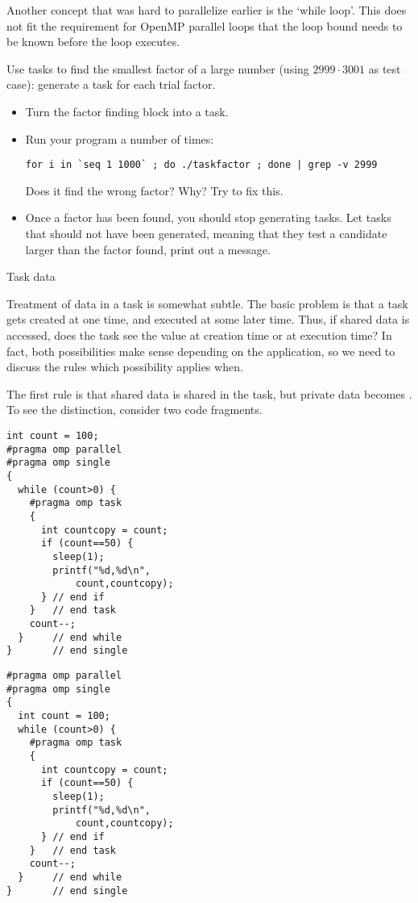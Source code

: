 Another concept that was hard to parallelize earlier is the `while
loop'. This does not fit the requirement for OpenMP parallel loops
that the loop bound needs to be known before the loop executes.

\begin{exercise}
  \label{ex:taskfactor}
  Use tasks to find the smallest factor of a large
  number (using $2999\cdot 3001$ as test case): generate a task for each
  trial factor.
  \begin{itemize}
  \item Turn the factor finding block into a task.
  \item Run your program a number of times:
\begin{verbatim}
for i in `seq 1 1000` ; do ./taskfactor ; done | grep -v 2999
\end{verbatim}
    Does it find the wrong factor? Why? Try to fix this.
\item Once a factor has been found, you should stop generating
    tasks.
    Let tasks that should not have been generated, meaning that they
    test a candidate larger than the factor found, print out a message.
  \end{itemize}
\end{exercise}


 {Task data}

Treatment of data in a task is somewhat subtle. The basic problem is
that a task gets created at one time, and executed at some later time.
Thus,
if shared data is accessed, does the task see the value at creation
time or at execution time? In fact, both possibilities make sense
depending on the application, so we need to discuss the rules 
which possibility applies when.

The first rule is that shared data is shared in the task, but private
data becomes . To see the distinction, consider two
code fragments.

\begin{multicols}{2}
\begin{lstlisting}[language=omp]
int count = 100;
#pragma omp parallel
#pragma omp single
{
  while (count>0) {
    #pragma omp task
    {
      int countcopy = count;
      if (count==50) {
        sleep(1);
        printf("%d,%d\n",
            count,countcopy);
      } // end if
    }   // end task
    count--;
  }     // end while
}       // end single
\end{lstlisting}

\columnbreak

\begin{lstlisting}[language=omp]
#pragma omp parallel
#pragma omp single
{
  int count = 100;
  while (count>0) {
    #pragma omp task
    {
      int countcopy = count;
      if (count==50) {
        sleep(1);
        printf("%d,%d\n",
            count,countcopy);
      } // end if
    }   // end task
    count--;
  }     // end while
}       // end single
\end{lstlisting}

\end{multicols}

